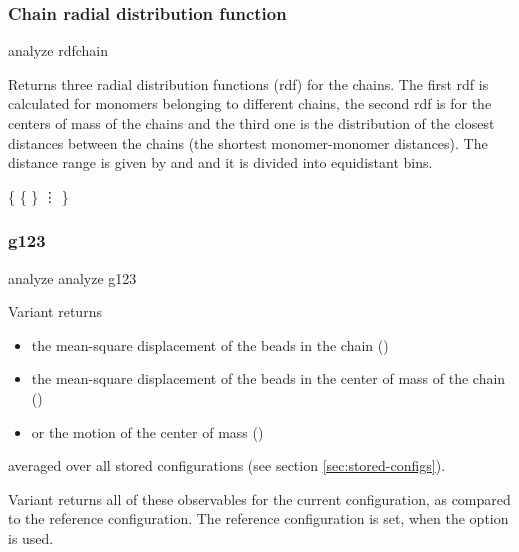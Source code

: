 \begin{essyntex}
\subsubsection{Chain radial distribution function}

\begin{essyntax}
 analyze rdfchain    
\end{essyntax}
Returns three radial distribution functions (rdf) for the chains. The
first rdf is calculated for monomers belonging to different chains,
the second rdf is for the centers of mass of the chains and the third
one is the distribution of the closest distances between the chains
(\ie the shortest monomer-monomer distances). The distance range is
given by  and  and it is divided into
 equidistant bins.

\begin{code}
\{ 
  \{    \}
  \vdots
\}
\end{code}

\subsubsection{g123}
\label{analyze:<g1>}
\label{analyze:<g2>}
\label{analyze:<g3>}
\label{analyze:g123}

\begin{essyntax}
   analyze  
   analyze g123  
\end{essyntax}

Variant  returns 
\begin{itemize}
\item the mean-square displacement of the beads in the
  chain ()
\item the mean-square displacement of the beads in the center of
  mass of the chain ()
\item or the motion of the center of mass ()
\end{itemize}
averaged over all stored configurations (see section
\vref{sec:stored-configs}).

Variant  returns all of these observables for the current
configuration, as compared to the reference configuration. The
reference configuration is set, when the option  is used.


\end{essyntex}
